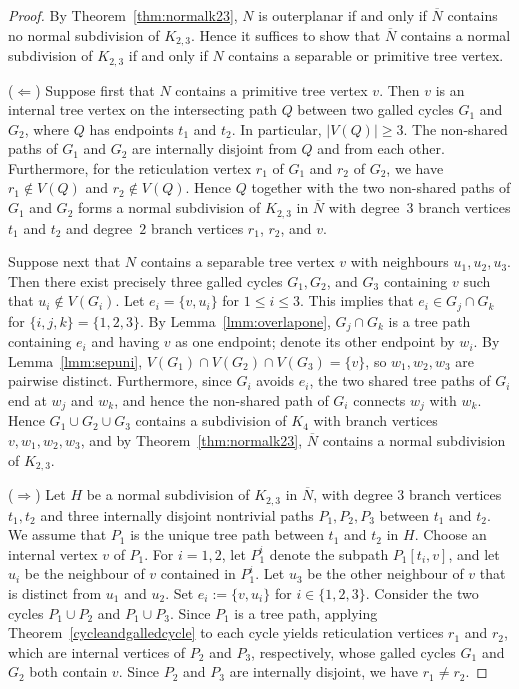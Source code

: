 \documentclass[pdflatex,sn-mathphys-num]{sn-jnl}
\theoremstyle{thmstyleone}%
\theoremstyle{thmstyletwo}%
\theoremstyle{thmstylethree}%
\begin{document}
\begin{proof}
By Theorem~\ref{thm:normalk23}, $N$ is outerplanar if and only if $\overline{N}$ contains no normal subdivision of $K_{2,3}$. Hence it suffices to show that $\overline{N}$ contains a normal subdivision of $K_{2,3}$ if and only if $N$ contains a separable or primitive tree vertex. 


($\Leftarrow$)
Suppose first that $N$ contains a primitive tree vertex $v$. Then $v$ is an internal tree vertex on the intersecting path $Q$ between two galled cycles $G_1$ and $G_2$, where $Q$ has endpoints $t_1$ and $t_2$. In particular, $|V(Q)|\geq 3$. The non-shared paths of $G_1$ and $G_2$ are internally disjoint from $Q$ and from each other. Furthermore, for the reticulation vertex $r_1$ of $G_1$ and $r_2$ of $G_2$, we have $r_1 \notin V(Q)$ and $r_2 \notin V(Q)$. Hence $Q$ together with the two non-shared paths of $G_1$ and $G_2$ forms a normal subdivision of $K_{2,3}$ in $\overline{N}$ with degree~$3$ branch vertices $t_1$ and $t_2$ and degree~$2$ branch vertices $r_1$, $r_2$, and $v$.

Suppose next that $N$ contains a separable tree vertex $v$ with neighbours $u_1,u_2,u_3$. Then there exist precisely three galled cycles $G_1,G_2$, and $G_3$ containing $v$ such that $u_i \notin V(G_i)$. Let $e_i=\{v,u_i\}$ for $1 \le i \le 3$. This implies that $e_i \in G_j\cap G_k$ for $\{i,j,k\}=\{1,2,3\}$. By Lemma~\ref{lmm:overlapone}, $G_j\cap G_k$ is a tree path containing $e_i$ and having $v$ as one endpoint; denote its other endpoint by $w_i$. By Lemma~\ref{lmm:sepuni}, $V(G_1)\cap V(G_2)\cap V(G_3)=\{v\}$, so $w_1,w_2,w_3$ are pairwise distinct. Furthermore, since $G_i$ avoids $e_i$, the two shared tree paths of $G_i$ end at $w_j$ and $w_k$, and hence the non-shared path of $G_i$ connects $w_j$ with $w_k$. Hence $G_1\cup G_2\cup G_3$ contains a subdivision of $K_4$ with branch vertices $v,w_1,w_2,w_3$, and by Theorem~\ref{thm:normalk23}, $\overline{N}$ contains a normal subdivision of $K_{2,3}$.

\smallskip

($\Rightarrow$)
Let $H$ be a normal subdivision of $K_{2,3}$ in $\overline{N}$, with degree $3$ branch vertices $t_1,t_2$ and three internally disjoint nontrivial paths $P_1,P_2,P_3$ between $t_1$ and $t_2$. We assume that $P_1$ is the unique tree path between $t_1$ and $t_2$ in $H$. Choose an internal vertex $v$ of $P_1$. For $i=1,2$, let $P_1^i$ denote the subpath $P_1[t_i,v]$, and let $u_i$ be the neighbour of $v$ contained in $P_1^i$. Let $u_3$ be the other neighbour of $v$ that is distinct from $u_1$ and $u_2$. Set $e_i:=\{v,u_i\}$ for $i\in\{1,2,3\}$. Consider the two cycles $P_1\cup P_2$ and $P_1\cup P_3$. Since $P_1$ is a tree path, applying Theorem~\ref{cycleandgalledcycle} to each cycle yields reticulation vertices $r_1$ and $r_2$, which are internal vertices of $P_2$ and $P_3$, respectively, whose galled cycles $G_1$ and $G_2$ both contain $v$. Since $P_2$ and $P_3$ are internally disjoint, we have $r_1\neq r_2$.


\end{proof}
\end{document}

